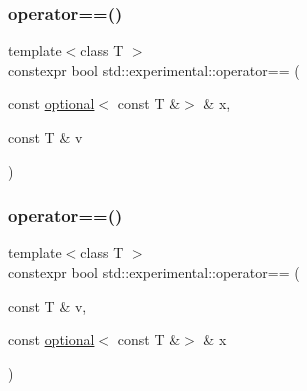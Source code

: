 \mbox{\label{namespacestd_1_1experimental_ad41e06efa15d85ead93eafecb8dde126}} 
\subsubsection{\texorpdfstring{operator==()}{operator==()}\hspace{0.1cm}{\footnotesize\ttfamily [8/9]}}
{\footnotesize\ttfamily template$<$class T $>$ \\
constexpr bool std\+::experimental\+::operator== (\begin{DoxyParamCaption}\item[{const \hyperlink{classstd_1_1experimental_1_1optional}{optional}$<$ const T \&$>$ \&}]{x,  }\item[{const T \&}]{v }\end{DoxyParamCaption})}

\mbox{\label{namespacestd_1_1experimental_a9ff726fa7b981eeae6f6b8e98eb514ce}} 
\subsubsection{\texorpdfstring{operator==()}{operator==()}\hspace{0.1cm}{\footnotesize\ttfamily [9/9]}}
{\footnotesize\ttfamily template$<$class T $>$ \\
constexpr bool std\+::experimental\+::operator== (\begin{DoxyParamCaption}\item[{const T \&}]{v,  }\item[{const \hyperlink{classstd_1_1experimental_1_1optional}{optional}$<$ const T \&$>$ \&}]{x }\end{DoxyParamCaption})}

\mbox{\label{namespacestd_1_1experimental_a1d2409f0cb8fda0ec9a0b9d5e1e61cb5}} 
